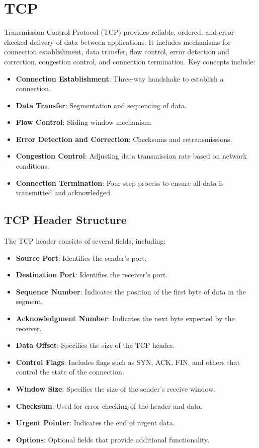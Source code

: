 \newpage

\section{TCP}
Transmission Control Protocol (TCP) provides reliable, ordered, and error-checked delivery of data between applications. It includes mechanisms for connection establishment, data transfer, flow control, error detection and correction, congestion control, and connection termination. Key concepts include:
\begin{itemize}
    \item \textbf{Connection Establishment}: Three-way handshake to establish a connection.
    \item \textbf{Data Transfer}: Segmentation and sequencing of data.
    \item \textbf{Flow Control}: Sliding window mechanism.
    \item \textbf{Error Detection and Correction}: Checksums and retransmissions.
    \item \textbf{Congestion Control}: Adjusting data transmission rate based on network conditions.
    \item \textbf{Connection Termination}: Four-step process to ensure all data is transmitted and acknowledged.
\end{itemize}

\subsection{TCP Header Structure}
The TCP header consists of several fields, including:
\begin{itemize}
    \item \textbf{Source Port}: Identifies the sender's port.
    \item \textbf{Destination Port}: Identifies the receiver's port.
    \item \textbf{Sequence Number}: Indicates the position of the first byte of data in the segment.
    \item \textbf{Acknowledgment Number}: Indicates the next byte expected by the receiver.
    \item \textbf{Data Offset}: Specifies the size of the TCP header.
    \item \textbf{Control Flags}: Includes flags such as SYN, ACK, FIN, and others that control the state of the connection.
    \item \textbf{Window Size}: Specifies the size of the sender's receive window.
    \item \textbf{Checksum}: Used for error-checking of the header and data.
    \item \textbf{Urgent Pointer}: Indicates the end of urgent data.
    \item \textbf{Options}: Optional fields that provide additional functionality.
\end{itemize}

